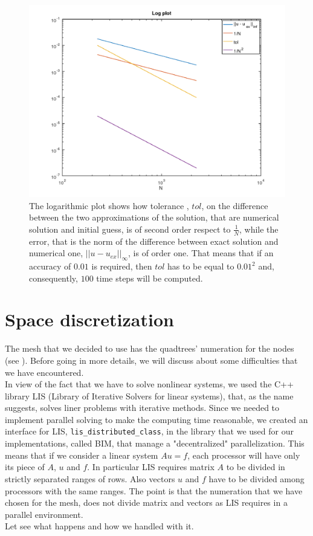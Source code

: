 \begin{figure}[h]
	\centering
	\includegraphics[width=1\linewidth]{time_order}
	\caption[Logarithmic plot of convergence orders is time adaptivity]{The logarithmic plot shows how tolerance , $ tol $, on the difference between the two approximations of the solution, that are numerical solution and initial guess, is of second order respect to $ \frac{1}{N} $, while the error, that is the norm of the difference between exact solution and numerical one, $|| u -u _{ex}||_{\infty}$, is of order one. That means that if an accuracy of $ 0.01 $ is required, then $tol$ has to be equal to $ 0.01^2 $ and, consequently, $ 100 $ time steps will be computed. }
	\label{time_order}
\end{figure}
\section{Space discretization}
The mesh that we decided to use has the quadtrees' numeration for the nodes (see \cite{p4est}). Before going in more details, we will discuss about some difficulties that we have encountered. \\
In view of the fact that we have to solve nonlinear systems, we used the C++ library LIS (Library of Iterative Solvers for linear systems), that, as the name suggests, solves liner problems with iterative methods. Since we needed to implement parallel solving to make the computing time reasonable, we created an interface for LIS, \texttt{lis\_distributed\_class}, in the library that we used for our implementations, called BIM, that manage a "decentralized" parallelization. This means that if we consider a linear system $ A u = f $, each processor will have  only its piece of $ A $, $ u $ and $ f $. In particular LIS requires matrix $ A $ to be divided in strictly separated ranges of rows. Also vectors $ u $ and $ f $ have to be divided among processors with the same ranges. The point is that the numeration that we have chosen for the mesh, does not divide matrix and vectors as LIS requires in a parallel environment. \\
Let see what happens and how we handled with it.

